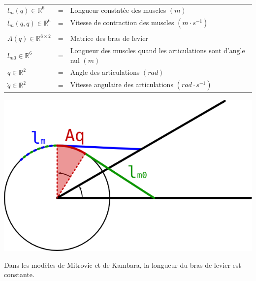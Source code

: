 \documentclass[pdftex,a4paper,11pt]{article}
\numberwithin{equation}{subsection}
\begin{document}
\begin{small}
\begin{tabular}{lcl}
    $l_m(q) \in \mathbb{R}^6$                  & = & Longueur constatée des muscles $(m)$ \\
    $\dot{l_m}(q, \dot{q}) \in \mathbb{R}^6$   & = & Vitesse de contraction des muscles $(m \cdot s^{-1})$ \\
    \\

    $A(q) \in \mathbb{R}^{6 \times 2}$   & = & Matrice des bras de levier \\
    $l_{m0} \in \mathbb{R}^6$            & = & Longueur des muscles quand les articulations sont d'angle nul $(m)$ \\
    $q \in \mathbb{R}^2$                 & = & Angle des articulations $(rad)$ \\
    $\dot{q} \in \mathbb{R}^2$           & = & Vitesse angulaire des articulations $(rad \cdot s^{-1})$ \\
\end{tabular}
\end{small}

\begin{center}
        \includegraphics[width=.50\linewidth]{fig/muscle_length}
\end{center}

Dans les modèles de Mitrovic et de Kambara, la longueur du bras de levier est constante.%
    
\begin{figure}[h]
    \centering
    ~~~
    ~~~
\end{figure}
\end{document}
